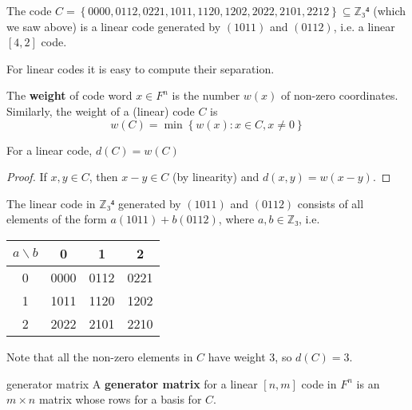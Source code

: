 \documentclass[english]{lbscript}
\begin{document}
\begin{example}{}{}
  The code \(C=\left\{ 0000, 0112, 0221, 1011, 1120, 1202, 2022, 2101, 2212 \right\} ⊆ ℤ₃⁴\) (which we saw above) is a linear code generated by \((1011)\) and \((0112)\), i.e. a linear \([4,2]\) code.
\end{example}

For linear codes it is easy to compute their separation.

\begin{definition}{}{}
  The \textbf{weight} of code word \(x∈F^{n}\) is the number \(w(x)\) of non-zero coordinates. Similarly, the weight of a (linear) code \(C\) is
  \begin{equation}
    \label{eq:138}
    w(C) = \min\left\{ w(x): x∈C, x≠0 \right\}
  \end{equation}
\end{definition}
\begin{theorem}{}{}
  For a linear code, \(d(C)=w(C)\)
\end{theorem}
\begin{proof}
  If \(x,y∈C\), then \(x-y∈C\) (by linearity) and \(d(x,y)=w(x-y)\).
\end{proof}

\begin{example}{}{}
  The linear code in \(ℤ₃⁴\) generated by \((1011)\) and \((0112)\) consists of all elements of the form \(a(1011)+b(0112)\), where \(a,b∈ℤ₃\), i.e.\\
  \begin{tabular}{c|ccc}
    \toprule
    \(a \backslash b\) & 0    & 1    & 2    \\
    \midrule
    0                  & 0000 & 0112 & 0221 \\
    1                  & 1011 & 1120 & 1202 \\
    2                  & 2022 & 2101 & 2210 \\
    \bottomrule
  \end{tabular}
  Note that all the non-zero elements in \(C\) have weight 3, so \(d(C)=3\).
\end{example}

\begin{definition}{generator matrix}{}
  A \textbf{generator matrix} for a linear \([n,m]\) code in \(F^{n}\) is an \(m×n\) matrix whose rows for a basis for \(C\).
\end{definition}
\end{document}
